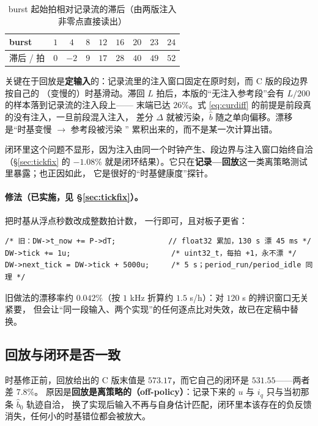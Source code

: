 \documentclass[11pt,a4paper]{ctexart}
\begin{document}
\begin{table}[H]
\centering
\caption{burst 起始拍相对记录流的滞后（由两版注入非零点直接读出）}
\label{tab:lag}
\small
\begin{tabular}{lcccccccc}
\toprule
burst & $1$ & $4$ & $8$ & $12$ & $16$ & $20$ & $23$ & $24$\\
\midrule
滞后 / 拍 & $0$ & $-2$ & $9$ & $17$ & $28$ & $40$ & $49$ & $52$\\
\bottomrule
\end{tabular}
\end{table}

关键在于回放是\textbf{定输入}的：记录流里的注入窗口固定在原时刻，而 C 版的段边界按自己的
（变慢的）时基滑动。滞回 $L$ 拍后，本版的“无注入参考段”会有 $L/200$ 的样本落到记录流的注入段上——
末端已达 $26\%$。式 \eqref{eq:curdiff} 的前提是前段真的没有注入，一旦前段混入注入，
差分 $\Delta$ 就被污染，$\hat b$ 随之单向偏移。漂移是“时基变慢 $\to$ 参考段被污染 ”
累积出来的，而不是某一次计算出错。

闭环里这个问题不显形，因为注入由同一个时钟产生、段边界与注入窗口始终自洽（\S\ref{sec:tickfix} 的
$-1.08\%$ 就是闭环结果）。它只在\textbf{记录—回放}这一类离策略测试里暴露；也正因如此，
它是很好的“时基健康度”探针。

\paragraph{修法（已实施，见 \S\ref{sec:tickfix}）。}把时基从浮点秒数改成整数拍计数，
一行即可，且对板子更省：

\begin{verbatim}
/* 旧：DW->t_now += P->dT;            // float32 累加，130 s 漂 45 ms */
DW->tick += 1u;                       /* uint32_t，每拍 +1，永不漂 */
DW->next_tick = DW->tick + 5000u;     /* 5 s；period_run/period_idle 同理 */
\end{verbatim}

旧做法的漂移率约 $0.042\%$（按 $1$ kHz 折算约 $1.5$ s/h）：对 $120$ s 的辨识窗口无关紧要，
但会让“同一段输入、两个实现”的任何逐点比对失效，故已在定稿中替换。

\subsection{回放与闭环是否一致}

时基修正前，回放给出的 C 版末值是 $573.17$，而它自己的闭环是 $531.55$——两者差 $7.8\%$。
原因是\textbf{回放是离策略的（off-policy）}：记录下来的 $u$ 与 $i_q$ 只与当初那条 $\hat b_0$ 轨迹自洽，
换了实现后输入不再与自身估计匹配，闭环里本该存在的负反馈消失，任何小的时基错位都会被放大。
\end{document}
